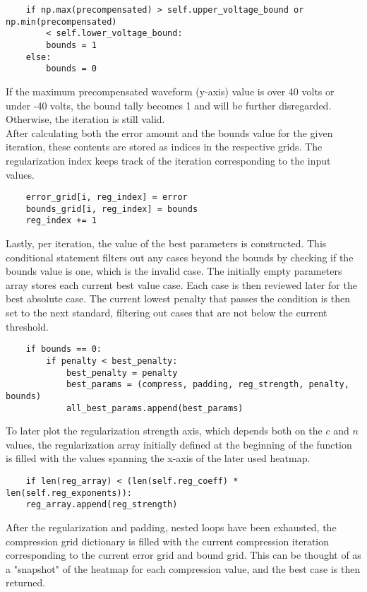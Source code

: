 \documentclass[11pt, a4paper]{article}
\theoremstyle{definition}
\numberwithin{equation}{section}
\begin{document}
\begin{verbatim}
    if np.max(precompensated) > self.upper_voltage_bound or np.min(precompensated) 
        < self.lower_voltage_bound:
        bounds = 1
    else:
        bounds = 0
\end{verbatim}

If the maximum precompensated waveform (y-axis) value is over 40 volts or under -40 volts, the bound tally becomes 1 and will be further disregarded. Otherwise, the iteration is still valid.
\\
After calculating both the error amount and the bounds value for the given iteration, these contents are stored as indices in the respective grids. The regularization index keeps track of the iteration corresponding to the input values.

\begin{verbatim}
    error_grid[i, reg_index] = error
    bounds_grid[i, reg_index] = bounds
    reg_index += 1
\end{verbatim}

Lastly, per iteration, the value of the best parameters is constructed. This conditional statement filters out any cases beyond the bounds by checking if the bounds value is one, which is the invalid case. The initially empty parameters array stores each current best value case. Each case is then reviewed later for the best absolute case. The current lowest penalty that passes the condition is then set to the next standard, filtering out cases that are not below the current threshold.

\begin{verbatim}
    if bounds == 0:
        if penalty < best_penalty:
            best_penalty = penalty
            best_params = (compress, padding, reg_strength, penalty, bounds)
            all_best_params.append(best_params)
\end{verbatim}

To later plot the regularization strength axis, which depends both on the $c$ and $n$ values, the regularization array initially defined at the beginning of the function is filled with the values spanning the x-axis of the later used heatmap.

\begin{verbatim}
    if len(reg_array) < (len(self.reg_coeff) * len(self.reg_exponents)):
    reg_array.append(reg_strength)
\end{verbatim}

After the regularization and padding, nested loops have been exhausted, the compression grid dictionary is filled with the current compression iteration corresponding to the current error grid and bound grid. This can be thought of as a "snapshot" of the heatmap for each compression value, and the best case is then returned.
\end{document}
